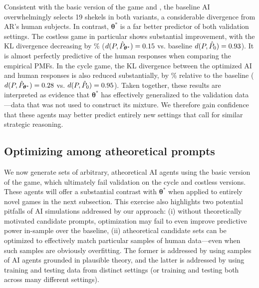 \documentclass[11pt]{article}
\theoremstyle{definition}
\newcommand{\aisub}{AI agent}
\newcommand{\persona}{prompt}
\begin{document}
Consistent with the basic version of the game and \cite{gao2024caution}, the baseline AI overwhelmingly selects 19 shekels in both variants, a considerable divergence from AR's human subjects. 
In contrast, $\bm{\theta}^*$ is a far better predictor of both validation settings. 
The costless game in particular shows substantial improvement, with the KL divergence decreasing by \KlPercDiffCostless\% ($d(P, \hat P_{\bm\theta^*}) = 0.15$ vs. baseline $d(P,\hat P_0) = 0.93$).
It is almost perfectly predictive of the human responses when comparing the empirical PMFs.
In the cycle game, the KL divergence between the optimized AI and human responses is also reduced substantially, by \KlPercDiffCycle\% relative to the baseline ($d(P, \hat P_{\bm\theta^*}) = 0.28$ vs. $d(P,\hat P_0) = 0.95$).
Taken together, these results are interpreted as evidence that $\bm{\theta}^*$ has effectively generalized to the validation data---data that was not used to construct its mixture.
We therefore gain confidence that these agents may better predict entirely new settings that call for similar strategic reasoning.

\subsection{Optimizing among atheoretical \persona{s}}
\label{sec:arbitrary_select}

We now generate sets of arbitrary, atheoretical \aisub{s} using the basic version of the game, which ultimately fail validation on the cycle and costless versions.
These agents will offer a substantial contrast with $\bm{\theta}^*$ when applied to entirely novel games in the next subsection.
This exercise also highlights two potential pitfalls of AI simulations addressed by our approach: (i) without theoretically motivated candidate \persona{s}, optimization may fail to even improve predictive power in-sample over the baseline, (ii) atheoretical candidate sets can be optimized to effectively match particular samples of human data---even when such samples are obviously overfitting.
The former is addressed by using samples of \aisub{s} grounded in plausible theory, and the latter is addressed by using training and testing data from distinct settings (or training and testing both across many different settings).
\end{document}
